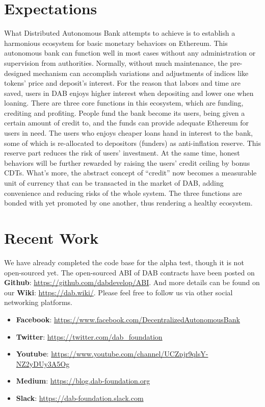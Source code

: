 \documentclass[review]{elsarticle}
\begin{document}
\section{Expectations}
What Distributed Autonomous Bank attempts to achieve is to establish a harmonious ecosystem for basic monetary behaviors on Ethereum. This autonomous bank can function well in most cases without any administration or supervision from authorities. Normally, without much maintenance, the pre-designed mechanism can accomplish variations and adjustments of indices like tokens' price and deposit's interest. For the reason that labors and time are saved, users in DAB enjoys higher interest when depositing and lower one when loaning.
There are three core functions in this ecosystem, which are funding, crediting and profiting. People fund the bank become its users, being given a certain amount of credit to, and the funds can provide adequate Ethereum for users in need. The users who enjoys cheaper loans hand in interest to the bank, some of which is re-allocated to depositors (funders) as anti-inflation reserve. This reserve part reduces the risk of users' investment.  At the same time, honest behaviors will be further rewarded by raising the users' credit ceiling by bonus CDTs. What's more, the abstract concept of ``credit'' now becomes a measurable unit of currency that can be transacted in the market of DAB, adding convenience and reducing risks of the whole system. The three functions are bonded with yet promoted by one another, thus rendering a healthy ecosystem.

\section{Recent Work}

We have already completed the code base for the alpha test, though it is not open-sourced yet. The open-sourced ABI of DAB contracts have been posted on \textbf{Github}: \underline{https://github.com/dabdevelop/ABI}. And more details can be found on our \textbf{Wiki}: \underline{https://dab.wiki/}. Please feel free to follow us via other social networking platforms.

\begin{itemize}
   \item \textbf{Facebook}: \underline{https://www.facebook.com/DecentralizedAutonomousBank}
   \item \textbf{Twitter}: \underline{https://twitter.com/dab\_foundation}
   \item \textbf{Youtube}: \underline{https://www.youtube.com/channel/UCZpjr9qlsY-NZ2yDUy3A5Og}
   \item \textbf{Medium}: \underline{https://blog.dab-foundation.org}
   \item \textbf{Slack}: \underline{https://dab-foundation.slack.com}
\end{itemize}
\end{document}
